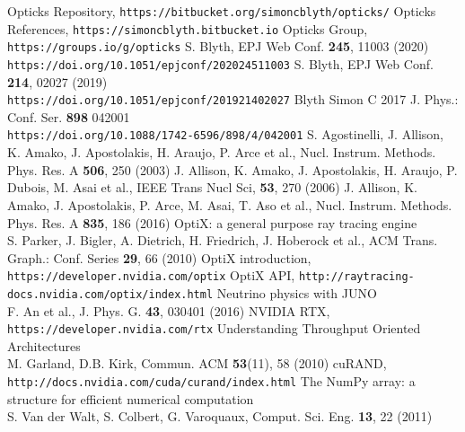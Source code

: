 \documentclass{webofc}
\begin{document}
\begin{thebibliography}{}
%
Opticks Repository, {\tt https://bitbucket.org/simoncblyth/opticks/}
Opticks References, {\tt https://simoncblyth.bitbucket.io}
Opticks Group, {\tt https://groups.io/g/opticks}
S. Blyth, EPJ Web Conf. {\bf 245}, 11003 (2020) \\
{\tt https://doi.org/10.1051/epjconf/202024511003}
S. Blyth, EPJ Web Conf. {\bf 214}, 02027 (2019) \\
{\tt https://doi.org/10.1051/epjconf/201921402027}
Blyth Simon C 2017 J. Phys.: Conf. Ser. {\bf 898} 042001 \\
{\tt https://doi.org/10.1088/1742-6596/898/4/042001}
%
%
%
%
%
%
%
S. Agostinelli, J. Allison, K. Amako, J. Apostolakis, H. Araujo, P. Arce et al., Nucl. Instrum. Methods. Phys. Res. A {\bf 506}, 250 (2003)
J. Allison, K. Amako, J. Apostolakis, H. Araujo, P. Dubois, M. Asai et al., IEEE Trans Nucl Sci, {\bf 53}, 270 (2006)
J. Allison, K. Amako, J. Apostolakis, P. Arce, M. Asai, T. Aso et al., Nucl. Instrum. Methods. Phys. Res. A {\bf 835}, 186 (2016)
%
%
%
%
%
OptiX: a general purpose ray tracing engine \\
S. Parker, J. Bigler, A. Dietrich, H. Friedrich, J. Hoberock et al., ACM Trans. Graph.: Conf. Series {\bf 29}, 66 (2010)
OptiX introduction, {\tt https://developer.nvidia.com/optix}
OptiX API, {\tt http://raytracing-docs.nvidia.com/optix/index.html}
%
%
%
%
Neutrino physics with JUNO \\
F. An et al., J. Phys. G. {\bf 43}, 030401 (2016) 
NVIDIA RTX, {\tt https://developer.nvidia.com/rtx}
%
%
Understanding Throughput Oriented Architectures \\
M. Garland, D.B. Kirk, Commun. ACM {\bf 53}(11), 58 (2010) 
cuRAND, {\tt http://docs.nvidia.com/cuda/curand/index.html}
The NumPy array: a structure for efficient numerical computation \\
S. Van der Walt, S. Colbert, G. Varoquaux, Comput. Sci. Eng. {\bf 13}, 22 (2011)
%
\end{thebibliography}
%
\end{document}
